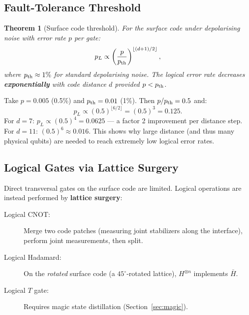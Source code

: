\documentclass[11pt, a4paper]{article}
\theoremstyle{definition}
\theoremstyle{plain}
\newtheorem{theorem}{Theorem}[section]
\theoremstyle{remark}
\begin{document}
\subsection{Fault-Tolerance Threshold}

\begin{theorem}[Surface code threshold]
For the surface code under depolarising noise with error rate $p$ per gate:
\[
  p_L \propto \left(\frac{p}{p_{\rm th}}\right)^{\lfloor(d+1)/2\rfloor},
\]
where $p_{\rm th} \approx 1\%$ for standard depolarising noise.  The logical
error rate decreases \textbf{exponentially} with code distance $d$ provided
$p < p_{\rm th}$.
\end{theorem}

\begin{workedexample}[Logical error rate for $d=5$]
Take $p = 0.005$ (0.5\%) and $p_{\rm th} = 0.01$ (1\%).  Then
$p/p_{\rm th} = 0.5$ and:
\[
  p_L \propto (0.5)^{\lfloor 6/2 \rfloor} = (0.5)^3 = 0.125.
\]
For $d=7$: $p_L \propto (0.5)^4 = 0.0625$ --- a factor 2 improvement
per distance step.  For $d=11$: $(0.5)^6 \approx 0.016$.  This shows
why large distance (and thus many physical qubits) are needed to reach
extremely low logical error rates.
\end{workedexample}

\subsection{Logical Gates via Lattice Surgery}

Direct transversal gates on the surface code are limited.  Logical operations
are instead performed by \textbf{lattice surgery}:

\begin{description}
  \item[Logical CNOT:] Merge two code patches (measuring joint stabilizers
        along the interface), perform joint measurements, then split.
  \item[Logical Hadamard:] On the \emph{rotated} surface code (a
        $45^\circ$-rotated lattice), $H^{\otimes n}$ implements $\bar{H}$.
  \item[Logical $T$ gate:] Requires magic state distillation
        (Section~\ref{sec:magic}).
\end{description}
\end{document}
